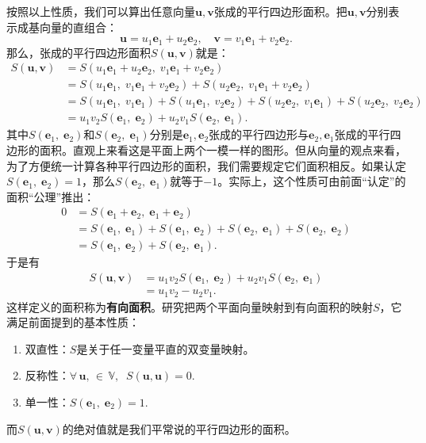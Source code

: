 \documentclass[12pt,UTF8,fontset=none]{ctexbook}
\begin{document}
按照以上性质，我们可以算出任意向量$\mathbf{u}, \mathbf{v}$张成的平行四边形面积。把$\mathbf{u}, \mathbf{v}$分别表示成基向量的直组合：
$$\mathbf{u} = u_1\mathbf{e}_1 + u_2\mathbf{e}_2, \quad \mathbf{v} = v_1\mathbf{e}_1 + v_2 \mathbf{e}_2. $$
那么，张成的平行四边形面积$S(\mathbf{u}, \mathbf{v})$就是：
\begin{align*}
    S(\mathbf{u}, \mathbf{v}) &= S(u_1\mathbf{e}_1 + u_2\mathbf{e}_2, \; v_1\mathbf{e}_1 + v_2 \mathbf{e}_2) \\
    &= S(u_1\mathbf{e}_1, \; v_1\mathbf{e}_1 + v_2 \mathbf{e}_2) + S(u_2\mathbf{e}_2, \; v_1\mathbf{e}_1 + v_2 \mathbf{e}_2) \\
    &= S(u_1\mathbf{e}_1, \; v_1\mathbf{e}_1) + S(u_1\mathbf{e}_1, \; v_2 \mathbf{e}_2) + S(u_2\mathbf{e}_2, \; v_1\mathbf{e}_1) + S(u_2\mathbf{e}_2, \; v_2 \mathbf{e}_2) \\
    &= u_1v_2 S(\mathbf{e}_1, \;\mathbf{e}_2) + u_2v_1 S(\mathbf{e}_2, \;\mathbf{e}_1).
\end{align*}
其中$S(\mathbf{e}_1, \;\mathbf{e}_2)$和$S(\mathbf{e}_2, \;\mathbf{e}_1)$分别是$\mathbf{e}_1, \mathbf{e}_2$张成的平行四边形与$\mathbf{e}_2, \mathbf{e}_1$张成的平行四边形的面积。直观上来看这是平面上两个一模一样的图形。但从向量的观点来看，为了方便统一计算各种平行四边形的面积，我们需要规定它们面积相反。如果认定$S(\mathbf{e}_1, \;\mathbf{e}_2) = 1$，那么$S(\mathbf{e}_2, \;\mathbf{e}_1)$就等于$-1$。实际上，这个性质可由前面“认定”的面积“公理”推出：
\begin{align*}
    0 &= S(\mathbf{e}_1 + \mathbf{e}_2, \;\mathbf{e}_1 + \mathbf{e}_2) \\
    &= S(\mathbf{e}_1, \;\mathbf{e}_1) + S(\mathbf{e}_1, \;\mathbf{e}_2) + S(\mathbf{e}_2, \;\mathbf{e}_1) + S(\mathbf{e}_2, \;\mathbf{e}_2) \\
    &= S(\mathbf{e}_1, \;\mathbf{e}_2) + S(\mathbf{e}_2, \;\mathbf{e}_1).
\end{align*}
于是有
\begin{align*}
    S(\mathbf{u}, \mathbf{v}) &= u_1v_2 S(\mathbf{e}_1, \;\mathbf{e}_2) + u_2v_1 S(\mathbf{e}_2, \;\mathbf{e}_1)\\
    &= u_1v_2 - u_2v_1.
\end{align*}
这样定义的面积称为\textbf{有向面积}。研究把两个平面向量映射到有向面积的映射$S$，它满足前面提到的基本性质：
\begin{enumerate}
    \item 双直性：$S$是关于任一变量平直的双变量映射。
    \item 反称性：$\forall \,\mathbf{u}, \, \in \, \mathbb{V}, \;\;S(\mathbf{u}, \mathbf{u}) = 0.$
    \item 单一性：$S(\mathbf{e}_1, \;\mathbf{e}_2) = 1.$
\end{enumerate}
而$S(\mathbf{u}, \mathbf{v})$的绝对值就是我们平常说的平行四边形的面积。
\end{document}
